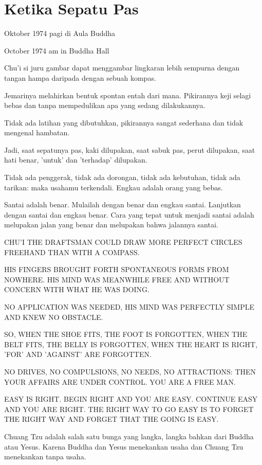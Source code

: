 \chapter{Ketika Sepatu Pas}

 Oktober 1974 pagi di Aula Buddha

 October 1974 am in Buddha Hall

\bahasa
Chu'i si juru gambar dapat menggambar lingkaran lebih sempurna dengan tangan hampa daripada dengan sebuah kompas.

Jemarinya melahirkan bentuk spontan entah dari mana. Pikirannya keji selagi bebas dan tanpa mempedulikan apa yang sedang dilakukannya.

Tidak ada latihan yang dibutuhkan, pikirannya sangat sederhana dan tidak mengenal hambatan.

Jadi, saat sepatunya pas, kaki dilupakan, saat sabuk pas, perut dilupakan, saat hati benar, 'untuk' dan 'terhadap' dilupakan.

Tidak ada penggerak, tidak ada dorongan, tidak ada kebutuhan, tidak ada tarikan: maka usahamu terkendali. Engkau adalah orang yang bebas.

Santai adalah benar. Mulailah dengan benar dan engkau santai. Lanjutkan dengan santai dan engkau benar. Cara yang tepat untuk menjadi santai adalah melupakan jalan yang benar dan melupakan bahwa jalannya santai.

\english
CHU'I THE DRAFTSMAN COULD DRAW MORE PERFECT CIRCLES FREEHAND THAN WITH A COMPASS.

HIS FINGERS BROUGHT FORTH SPONTANEOUS FORMS FROM NOWHERE. HIS MIND WAS MEANWHILE FREE AND WITHOUT CONCERN WITH WHAT HE WAS DOING.

NO APPLICATION WAS NEEDED, HIS MIND WAS PERFECTLY SIMPLE AND KNEW NO OBSTACLE.

SO, WHEN THE SHOE FITS, THE FOOT IS FORGOTTEN, WHEN THE BELT FITS, THE BELLY IS FORGOTTEN, WHEN THE HEART IS RIGHT, ’FOR’ AND ’AGAINST’ ARE FORGOTTEN.

NO DRIVES, NO COMPULSIONS, NO NEEDS, NO ATTRACTIONS: THEN YOUR AFFAIRS ARE UNDER CONTROL. YOU ARE A FREE MAN.

EASY IS RIGHT. BEGIN RIGHT AND YOU ARE EASY. CONTINUE EASY AND YOU ARE RIGHT. THE RIGHT WAY TO GO EASY IS TO FORGET THE RIGHT WAY AND FORGET THAT THE GOING IS EASY.

\bahasa
Chuang Tzu adalah salah satu bunga yang langka, langka bahkan dari Buddha atau Yesus. Karena Buddha dan Yesus menekankan usaha dan Chuang Tzu menekankan tanpa usaha.

